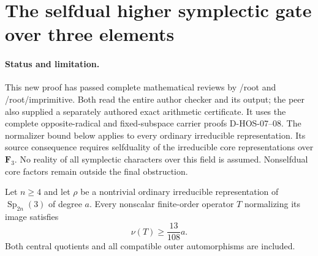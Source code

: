\section{The selfdual higher symplectic gate over three elements}
\label{sec:higher-symplectic-three}

\paragraph{Status and limitation.}
This new proof has passed complete mathematical reviews by /root and
/root/imprimitive. Both read the entire author checker and its output;
the peer also supplied a separately authored exact arithmetic certificate.
It uses the complete
opposite-radical and fixed-subspace carrier proofs D-HOS-07--08.
The normalizer bound below applies to every ordinary irreducible
representation. Its source consequence requires selfduality of the
irreducible core representations over $\mathbf F_3$. No reality of
all symplectic characters over this field is assumed. Nonselfdual
core factors remain outside the final obstruction.

\begin{lemma}
\label{D-HOS-11}
Let $n\ge4$ and let $\rho$ be a nontrivial ordinary irreducible
representation of $\operatorname{Sp}_{2n}(3)$ of degree $a$.
Every nonscalar finite-order operator $T$ normalizing its image
satisfies
\[
                              \nu(T)\ge\frac{13}{108}a.
                                                               \tag{HOS3.1}
\]
Both central quotients and all compatible outer automorphisms
are included.
\end{lemma}

